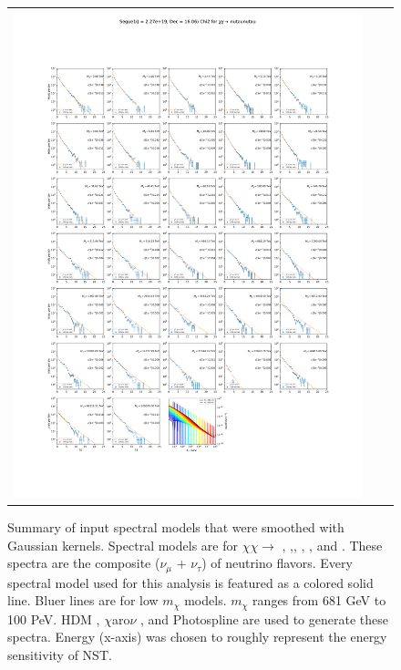 \begin{figure}[!hb]
{\begin{tabular}{ccc}
            \includegraphics[clip, trim=22.1cm 6.5cm 19.5cm 56.5cm, scale=0.55]{figures/ic_DM/dm_plots/Segue1_nutaunutau_chi2_Masspanel_2024-03-23.pdf} \\
        \end{tabular}
    }\caption{Summary of input spectral models that were smoothed with Gaussian kernels. Spectral models are for $\chi\chi \rightarrow$ , \parpar{\mu},\parpar{\tau}, , \parpar{\nu_\mu}, and \parpar{\nu_\tau}. These spectra are the composite ($\nu_\mu$ + $\nu_\tau$) of neutrino flavors. Every spectral model used for this analysis is featured as a colored solid line. Bluer lines are for low $m_\chi$ models. $m_\chi$ ranges from 681 GeV to 100 PeV. HDM \cite{Rodd:HDM_spec}, $\chi$aro$\nu$ \cite{Charon}, and Photospline \cite{photospline} are used to generate these spectra. Energy (x-axis) was chosen to roughly represent the energy sensitivity of NST.}
    \label{fig:line_spectra_smooth}
\end{figure}


